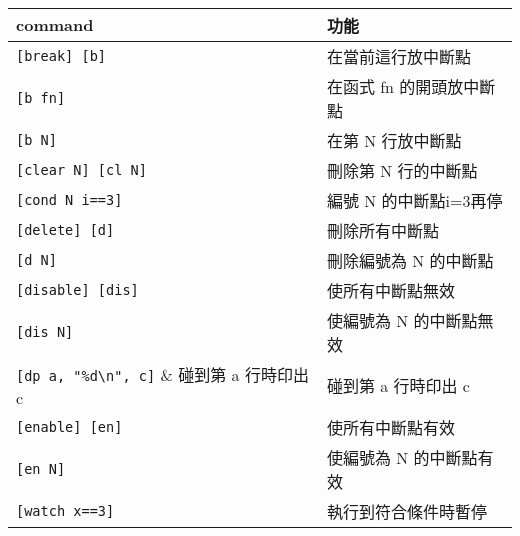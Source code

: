 \begin{center}
     \\
    \begin{tabular}{|p{2.7cm}|p{2.7cm}|}
        \hline
        command                         & 功能 \\
        \hline
        \verb|[break] [b]|              & 在當前這行放中斷點 \\
        \verb|[b fn]|                   & 在函式 fn 的開頭放中斷點 \\
        \verb|[b N]|                    & 在第 N 行放中斷點 \\
        \verb|[clear N] [cl N]|         & 刪除第 N 行的中斷點 \\
        \verb|[cond N i==3]|            & 編號 N 的中斷點i=3再停 \\
        \verb|[delete] [d]|             & 刪除所有中斷點 \\
        \verb|[d N]|                    & 刪除編號為 N 的中斷點 \\
        \verb|[disable] [dis]|          & 使所有中斷點無效 \\
        \verb|[dis N]|                  & 使編號為 N 的中斷點無效 \\
        \verb|[dp a, "%d\n", c]|        & 碰到第 a 行時印出 c \\
        \verb|[enable] [en]|            & 使所有中斷點有效 \\
        \verb|[en N]|                   & 使編號為 N 的中斷點有效 \\
        \verb|[watch x==3]|             & 執行到符合條件時暫停 \\
        \hline
    \end{tabular} \\
    \hspace{\fill} \\
    \hspace{\fill} \\


\end{center}
